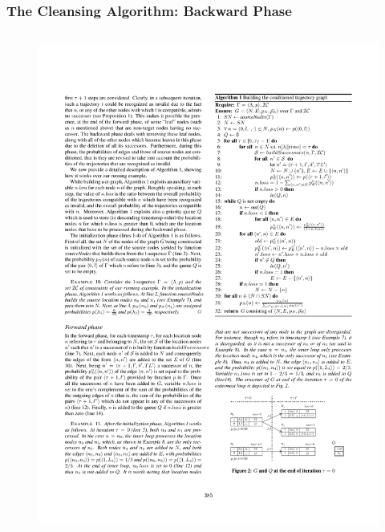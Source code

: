 \begin{frame}
\begin{columns}
\end{columns}

\end{frame}


\begin{frame}
\frametitle{The Cleansing Algorithm: Backward Phase}

\begin{columns}

  \begin{figure}[tb]
    \includegraphics[width=\columnwidth]{figures/3-4/3-4-8.pdf}
  \end{figure}


\end{columns}
\end{frame}

